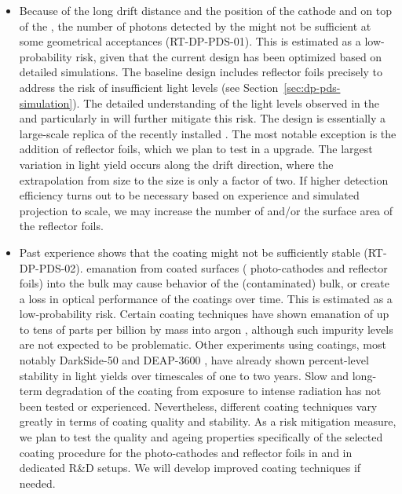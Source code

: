 \begin{itemize}

\item Because of the long drift distance and the position of the cathode and  on top of the , the number of photons detected by the  might not be sufficient at some geometrical acceptances (RT-DP-PDS-01). This is estimated as a low-probability risk, given that the current  design has been optimized based on detailed simulations. The  baseline design includes  reflector foils precisely to address the risk of insufficient light levels (see Section~\ref{sec:dp-pds-simulation}). The detailed understanding of the light levels observed in the  and particularly in  will further mitigate this risk. The \dune {}  design is essentially a large-scale replica of the recently installed  . 
The most notable exception is the addition of  reflector foils, %
which we plan to test in a   upgrade. The largest variation in light yield occurs along the drift direction, where the extrapolation from  size to the   size is only a factor of two. If higher  detection efficiency turns out to be necessary based on  experience and simulated projection to \dune scale, we may increase the number of  %
and/or the surface area of the  reflector foils. %

\item Past experience shows that the  coating might not be sufficiently stable (RT-DP-PDS-02).  emanation from coated surfaces ( photo-cathodes and  reflector foils) into the bulk  may cause  behavior of the (contaminated)  bulk, or create a loss in optical performance of the coatings over time. This is estimated as a low-probability risk. 
Certain coating techniques have shown %
 emanation of up to tens of parts per billion by mass into argon \cite{Asaadi:2018ixs}, although such impurity levels are not expected to be problematic. %
Other  experiments using  coatings, most notably DarkSide-50 \cite{Agnes:2018fwg} and DEAP-3600 \cite{Ajaj:2019imk}, have already shown percent-level stability in  light yields over timescales of one to two years. Slow and long-term degradation of the  coating from exposure to intense  radiation has not been tested or experienced. Nevertheless, different coating techniques vary greatly in terms of coating quality and stability. As a risk mitigation measure, we plan to test the quality and ageing properties specifically of the %
selected coating procedure %
for the  photo-cathodes and  reflector foils in  and in dedicated R\&D setups. We will %
develop improved coating techniques if needed.


\end{itemize}
